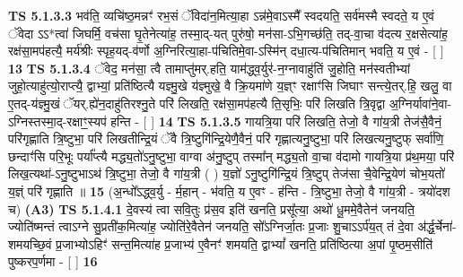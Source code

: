 \documentclass[17pt]{extarticle}
\begin{document}
                  \newline
                                \textbf{ TS 5.1.3.3} \newline
                  भव॑ति॒ व्यचि॑ष्ठ॒मन्नꣳ॑ रभ॒सं ॅविदा॑न॒मित्या॒हा ऽन्न॑मे॒वाऽस्मै᳚ स्वदयति॒ सर्व॑मस्मै स्वदते॒ य ए॒वं ॅवेदा ऽऽ*त्वा॑ जिघर्मि॒ वच॑सा घृ॒तेनेत्या॑ह॒ तस्मा॒द्-यत् पुरु॑षो॒ मन॑सा-ऽभि॒गच्छ॑ति॒ तद्-वा॒चा व॑दत्य र॒क्षसेत्या॑ह॒ रक्ष॑सा॒मप॑हत्यै॒ मर्य॑श्रीः स्पृह॒यद्-व॑र्णो अ॒ग्निरित्या॒हा-प॑चितिमे॒वा-ऽस्मि॑न् दधा॒त्य-प॑चितिमान् भवति॒ य ए॒वं - [  ] \textbf{  13} \newline
                  \newline
                                \textbf{ TS 5.1.3.4} \newline
                  ॅवेद॒ मन॑सा॒ त्वै तामाप्तु॑मर्.हति॒ याम॑द्ध्व॒र्युर॑-न॒ग्नावाहु॑तिं जु॒होति॒ मन॑स्वतीभ्यां जुहो॒त्याहु॑त्यो॒राप्त्यै॒ द्वाभ्यां॒ प्रति॑ष्ठित्यै यज्ञ्मु॒खे य॑ज्ञ्मुखे॒ वै क्रि॒यमा॑णे य॒ज्ञ्ꣳ रक्षाꣳ॑सि जिघाꣳ सन्त्ये॒तर्.हि॒ खलु॒ वा ए॒तद्-य॑ज्ञ्मु॒खं ॅयर्.ह्ये॑न॒दाहु॑तिरश्नु॒ते परि॑ लिखति॒ रक्ष॑सा॒मप॑हत्यै ति॒सृभिः॒ परि॑ लिखति त्रि॒वृद्वा अ॒ग्निर्यावा॑ने॒वा-ऽग्निस्तस्मा॒द्-रक्षाꣳ॒॒स्यप॑ हन्ति - [  ] \textbf{  14} \newline
                  \newline
                                \textbf{ TS 5.1.3.5} \newline
                  गायत्रि॒या परि॑ लिखति॒ तेजो॒ वै गा॑य॒त्री तेज॑सै॒वैनं॒ परि॑गृह्णाति त्रि॒ष्टुभा॒ परि॑ लिखतीन्द्रि॒यं ॅवै त्रि॒ष्टुगि॑न्द्रि॒येणै॒वैनं॒ परि॑ गृह्णात्यनु॒ष्टुभा॒ परि॑ लिखत्यनु॒ष्टुफ् सर्वा॑णि॒ छन्दाꣳ॑सि परि॒भूः पर्या᳚प्त्यै मद्ध्य॒तो॑ऽनु॒ष्टुभा॒ वाग्वा अ॑नु॒ष्टुप् तस्मा᳚न् मद्ध्य॒तो वा॒चा व॑दामो गायत्रि॒या प्र॑थ॒मया॒ परि॑ लिख॒त्यथा॑-ऽनु॒ष्टुभाऽथ॑ त्रि॒ष्टुभा॒ तेजो॒ वै गा॑य॒त्री ( ) य॒ज्ञो॑ ऽनु॒ष्टुगि॑न्द्रि॒यं त्रि॒ष्टुप् तेज॑सा चै॒वेन्द्रि॒येण॑ चोभ॒यतो॑ य॒ज्ञ्ं परि॑ गृह्णाति ॥ \textbf{  15 } \newline
                  \newline
                      (अ॒न्धो᳚ऽद्ध्व॒र्यु - र्म॒हान् - भ॑वति॒ य ए॒वꣳ - ह॑न्ति - त्रि॒ष्टुभा॒ तेजो॒ वै गा॑य॒त्री - त्रयो॑दश च)  \textbf{(A3)} \newline \newline
                                        \textbf{ TS 5.1.4.1} \newline
                  दे॒वस्य॑ त्वा सवि॒तुः प्र॑स॒व इति॑ खनति॒ प्रसू᳚त्या॒ अथो॑ धू॒ममे॒वैतेन॑ जनयति॒ ज्योति॑ष्मन्तं त्वाऽग्ने सु॒प्रती॑क॒मित्या॑ह॒ ज्योति॑रे॒वैतेन॑ जनयति॒ सो᳚ऽग्निर्जा॒तः प्र॒जाः शु॒चाऽऽर्प॑य॒त् तं दे॒वा अ॑र्द्ध॒र्चेना॑-शमयच्छि॒वं प्र॒जाभ्योऽहिꣳ॑ सन्त॒मित्या॑ह प्र॒जाभ्य॑ ए॒वैनꣳ॑ शमयति॒ द्वाभ्यां᳚ खनति॒ प्रति॑ष्ठित्या अ॒पां पृ॒ष्ठम॒सीति॑ पुष्करप॒र्णमा - [  ] \textbf{  16} \newline
\end{document}
